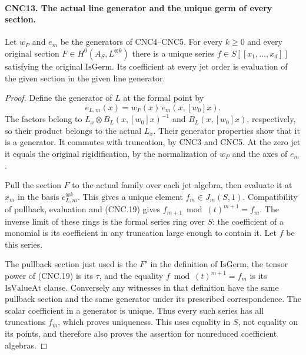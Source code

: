 \paragraph{CNC13. The actual line generator and the unique germ of every section.}
\label{claim:CNC13}
Let \(w_P\) and \(e_m\) be the generators of CNC4--CNC5.
For every \(k\geq0\) and every original section
\(F\in H^0(A_S,L^{\otimes k})\) there is a unique series
\(f\in S[[x_1,\ldots,x_d]]\) satisfying the original
\(\mathrm{IsGerm}\).  Its coefficient at every jet order is
evaluation of the given section in the given line generator.
\begin{proof}
Define the generator of \(L\) at the formal point by
\[
 e_{L,m}(x)=w_P(x)\,e_m(x,[w_0]x).                           \tag{CNC.19}
\]
The factors belong to \(L_x\otimes B_L(x,[w_0]x)^{-1}\)
and \(B_L(x,[w_0]x)\), respectively, so their product belongs
to the actual \(L_x\).  Their generator properties show that it is
a generator.  It commutes with truncation, by CNC3 and CNC5.
At the zero jet it equals the original rigidification, by the
normalization of \(w_P\) and the axes of \(e_m\).

Pull the section \(F\) to the actual family over each jet algebra,
then evaluate it at \(x_m\) in the basis \(e_{L,m}^{\otimes k}\).
This gives a unique element \(f_m\in J_m(S,1)\).
Compatibility of pullback, evaluation and (CNC.19) gives
\(f_{m+1}\bmod(t)^{m+1}=f_m\).
The inverse limit of these rings is the formal series ring over \(S\):
the coefficient of a monomial is its coefficient in any truncation
large enough to contain it.  Let \(f\) be this series.

The pullback section just used is the \(F'\) in the definition of
\(\mathrm{IsGerm}\), the tensor power of (CNC.19) is its
\(\tau\), and the equality \(f\bmod(t)^{m+1}=f_m\) is its
\(\mathrm{IsValueAt}\) clause.  Conversely any witnesses in that
definition have the same pullback section and the same generator under
its prescribed correspondence.  The scalar coefficient in a generator
is unique.  Thus every such series has all truncations \(f_m\),
which proves uniqueness.  This uses equality in \(S\), not equality
on its points, and therefore also proves the assertion for nonreduced
coefficient algebras.
\end{proof}

